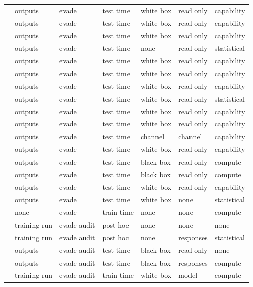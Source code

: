 \begin{landscape}
\begin{longtable}{rllllll}
\cite{CYDS26} & outputs & evade & test time & white box & read only & capability \\
\cite{ACW18} & outputs & evade & test time & white box & read only & capability \\
\cite{CAPBRTGMK19} & outputs & evade & test time & white box & read only & capability \\
\cite{CBM18} & outputs & evade & test time & none & read only & statistical \\
\cite{WK18} & outputs & evade & test time & white box & read only & capability \\
\cite{SYLZZRB19} & outputs & evade & test time & white box & read only & capability \\
\cite{SSTTM18} & outputs & evade & test time & white box & read only & capability \\
\cite{MHS22} & outputs & evade & test time & white box & read only & statistical \\
\cite{CASDFCMH21} & outputs & evade & test time & white box & read only & capability \\
\cite{TSETM19} & outputs & evade & test time & white box & read only & capability \\
\cite{HDDH26} & outputs & evade & test time & channel & channel & capability \\
\cite{SWKBC25} & outputs & evade & test time & white box & read only & capability \\
\cite{FK24} & outputs & evade & test time & black box & read only & compute \\
\cite{SSZHTE24} & outputs & evade & test time & black box & read only & compute \\
\cite{APU25} & outputs & evade & test time & white box & read only & capability \\
\cite{MHS19} & outputs & evade & test time & white box & none & statistical \\
\cite{DNV19} & none & evade & train time & none & none & compute \\
\cite{Sha23} & training run & evade audit & post hoc & none & none & none \\
\cite{NK26} & training run & evade audit & post hoc & none & responses & statistical \\
\cite{RCA24} & outputs & evade audit & test time & black box & read only & none \\
\cite{CGZ24} & outputs & evade audit & test time & black box & responses & compute \\
\cite{ZCSL24} & training run & evade audit & train time & white box & model & compute \\

\end{longtable}
\end{landscape}
